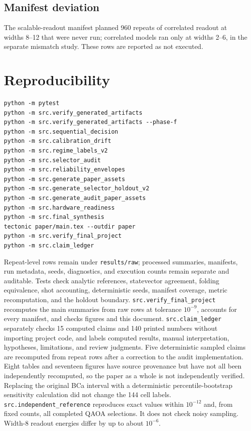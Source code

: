 \documentclass[10pt,twocolumn]{article}
\begin{document}
\subsection{Manifest deviation}
The scalable-readout manifest planned 960 repeats of correlated readout at widths 8--12
that were never run; correlated models ran only at widths 2--6, in the separate mismatch study.
These rows are reported as not executed.




\appendix
\section{Reproducibility}
{\footnotesize
\begin{verbatim}
python -m pytest
python -m src.verify_generated_artifacts
python -m src.verify_generated_artifacts --phase-f
python -m src.sequential_decision
python -m src.calibration_drift
python -m src.regime_labels_v2
python -m src.selector_audit
python -m src.reliability_envelopes
python -m src.generate_paper_assets
python -m src.generate_selector_holdout_v2
python -m src.generate_audit_paper_assets
python -m src.hardware_readiness
python -m src.final_synthesis
tectonic paper/main.tex --outdir paper
python -m src.verify_final_project
python -m src.claim_ledger
\end{verbatim}
}
Repeat-level rows remain under \texttt{results/raw}; processed summaries, manifests,
run metadata, seeds, diagnostics, and execution counts remain separate and auditable.
Tests check analytic references, statevector agreement, folding equivalence, shot
accounting, deterministic seeds, manifest coverage, metric recomputation, and the
holdout boundary. \texttt{src.verify\_final\_project} recomputes the main summaries from raw rows
at tolerance $10^{-9}$, accounts for every manifest, and checks figures and this document.
\texttt{src.claim\_ledger} separately checks 15 computed claims and 140 printed numbers without
importing project code, and labels computed results, manual interpretation, hypotheses, limitations,
and review judgments. Five deterministic sampled claims are recomputed from repeat rows after a
correction to the audit implementation. Eight tables and seventeen figures have source provenance but
have not all been independently recomputed, so the paper as a whole is not independently verified.
Replacing the original BCa interval with a deterministic percentile-bootstrap sensitivity calculation
did not change the 144 cell labels.
\texttt{src.independent\_reference} reproduces exact values within $10^{-12}$ and, from fixed counts,
all completed QAOA selections. It does not check noisy sampling. Width-8 readout energies differ by up to about $10^{-6}$.
\end{document}
